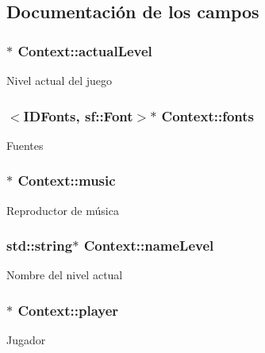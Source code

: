 \subsection{Documentación de los campos}
\hypertarget{classContext_ac7837bc30a1a062d5caab054ffedd917}{}
\subsubsection[{actual\+Level}]{$\ast$ Context\+::actual\+Level}\label{classContext_ac7837bc30a1a062d5caab054ffedd917}
Nivel actual del juego \hypertarget{classContext_a6e5b6ab3c18fc7f42f205774a597cdc1}{}
\subsubsection[{fonts}]{$<$I\+D\+Fonts, sf\+::\+Font$>$$\ast$ Context\+::fonts}\label{classContext_a6e5b6ab3c18fc7f42f205774a597cdc1}
Fuentes \hypertarget{classContext_aaec563a152c2a98312c9f72a1b0a342a}{}
\subsubsection[{music}]{$\ast$ Context\+::music}\label{classContext_aaec563a152c2a98312c9f72a1b0a342a}
Reproductor de música \hypertarget{classContext_af675004382eab82f05bd95b5d614e6cf}{}
\subsubsection[{name\+Level}]{\setlength{\rightskip}{0pt plus 5cm}std\+::string$\ast$ Context\+::name\+Level}\label{classContext_af675004382eab82f05bd95b5d614e6cf}
Nombre del nivel actual \hypertarget{classContext_a56c6b66908f8cb170e85a5a0e8dc6081}{}
\subsubsection[{player}]{$\ast$ Context\+::player}\label{classContext_a56c6b66908f8cb170e85a5a0e8dc6081}
Jugador \hypertarget{classContext_ad83991aa701d0e22274e61e8bedb186f}{}
